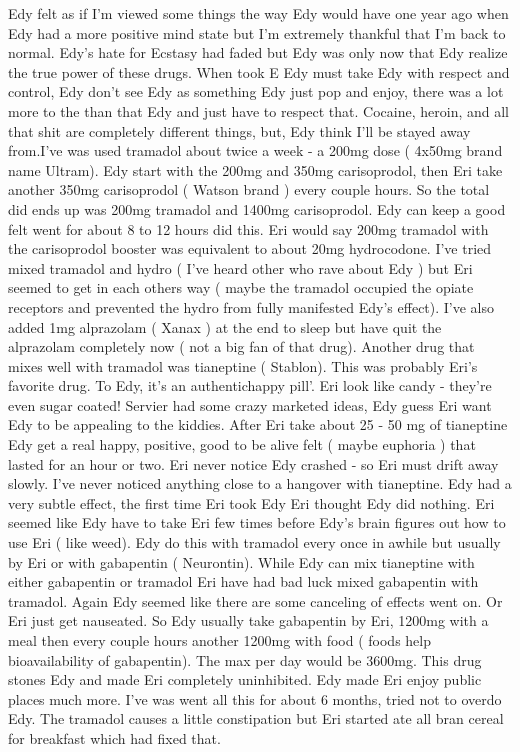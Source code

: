 \documentclass[12pt]{book}
\begin{document}
Edy felt as if I'm viewed some things the way Edy would have one year ago when Edy had a more positive mind state but I'm extremely thankful that I'm back to normal. Edy's hate for Ecstasy had faded but Edy was only now that Edy realize the true power of these drugs. When took E Edy must take Edy with respect and control, Edy don't see Edy as something Edy just pop and enjoy, there was a lot more to the than that Edy and just have to respect that. Cocaine, heroin, and all that shit are completely different things, but, Edy think I'll be stayed away from.I've was used tramadol about twice a week - a 200mg dose ( 4x50mg brand name Ultram). Edy start with the 200mg and 350mg carisoprodol, then Eri take another 350mg carisoprodol ( Watson brand ) every couple hours. So the total did ends up was 200mg tramadol and 1400mg carisoprodol. Edy can keep a good felt went for about 8 to 12 hours did this. Eri would say 200mg tramadol with the carisoprodol booster was equivalent to about 20mg hydrocodone. I've tried mixed tramadol and hydro ( I've heard other who rave about Edy ) but Eri seemed to get in each others way ( maybe the tramadol occupied the opiate receptors and prevented the hydro from fully manifested Edy's effect). I've also added 1mg alprazolam ( Xanax ) at the end to sleep but have quit the alprazolam completely now ( not a big fan of that drug). Another drug that mixes well with tramadol was tianeptine ( Stablon). This was probably Eri's favorite drug. To Edy, it's an authentichappy pill'. Eri look like candy - they're even sugar coated! Servier had some crazy marketed ideas, Edy guess Eri want Edy to be appealing to the kiddies. After Eri take about 25 - 50 mg of tianeptine Edy get a real happy, positive, good to be alive felt ( maybe euphoria ) that lasted for an hour or two. Eri never notice Edy crashed - so Eri must drift away slowly. I've never noticed anything close to a hangover with tianeptine. Edy had a very subtle effect, the first time Eri took Edy Eri thought Edy did nothing. Eri seemed like Edy have to take Eri few times before Edy's brain figures out how to use Eri ( like weed). Edy do this with tramadol every once in awhile but usually by Eri or with gabapentin ( Neurontin). While Edy can mix tianeptine with either gabapentin or tramadol Eri have had bad luck mixed gabapentin with tramadol. Again Edy seemed like there are some canceling of effects went on. Or Eri just get nauseated. So Edy usually take gabapentin by Eri, 1200mg with a meal then every couple hours another 1200mg with food ( foods help bioavailability of gabapentin). The max per day would be 3600mg. This drug stones Edy and made Eri completely uninhibited. Edy made Eri enjoy public places much more. I've was went all this for about 6 months, tried not to overdo Edy. The tramadol causes a little constipation but Eri started ate all bran cereal for breakfast which had fixed that.
\end{document}
